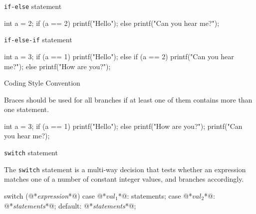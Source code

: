 \documentclass[compress]{beamer}
\begin{document}
\begin{slide}
	\begin{block}{\texttt{if-else} statement}

	\begin{terminal}
	int a = 2;
	if (a == 2)
	    printf("Hello");
	else
	    printf("Can you hear me?");
	\end{terminal}

	\end{block}
\end{slide}

\begin{slide}
	\begin{block}{\texttt{if-else-if} statement}

	\begin{terminal}
	int a = 3;
	if (a == 1)
	    printf("Hello");
	else if (a == 2)
	    printf("Can you hear me?");
	else
	    printf("How are you?");
	\end{terminal}

	\end{block}
\end{slide}

\begin{slide}
	\begin{block}{Coding Style Convention}

	Braces should be used for all branches if at least one of them contains more than one statement.

	\begin{terminal}
	int a = 3;
	if (a == 1) {
	    printf("Hello");
	} else {
	    printf("How are you?");
	    printf("Can you hear me?);
	}
	\end{terminal}

	\end{block}
\end{slide}

\begin{slide}
	\begin{block}{\texttt{switch} statement}

	The \texttt{switch} statement is a multi-way decision that tests whether an expression matches one of a number of \alert{constant} integer values, and branches accordingly.

	\begin{terminal}
	switch (@*\textit{expression}*@) {
	case @*$\mathit{val}_1$*@:
	    statements;
	case @*$\mathit{val}_2$*@:
	    @*\textit{statements}*@;
	default:
	    @*\textit{statements}*@;
	}
	\end{terminal}

	\end{block}
\end{slide}
\end{document}

